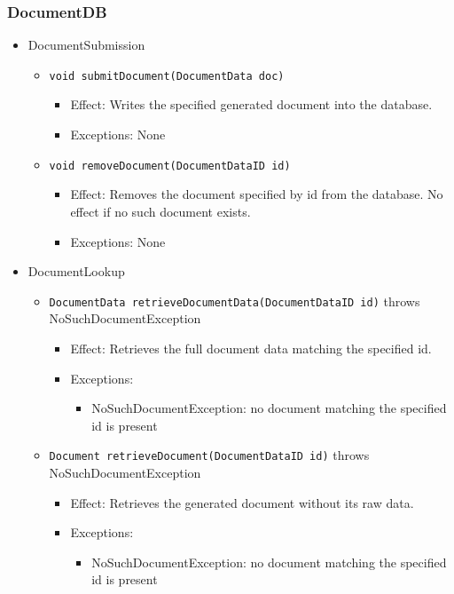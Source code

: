 \documentclass[a4paper,10pt]{article}
\begin{document}
\subsubsection*{DocumentDB}
\begin{itemize}
    \item DocumentSubmission
    \begin{itemize}
        \item \texttt{void submitDocument(DocumentData doc)}
        \begin{itemize}
            \item Effect: Writes the specified generated document into the database.
            \item Exceptions: None
        \end{itemize}

        \item \texttt{void removeDocument(DocumentDataID id)}
        \begin{itemize}
            \item Effect: Removes the document specified by id from the database. No effect if no such document exists.
            \item Exceptions: None
         \end{itemize}
    \end{itemize}
    
    \item DocumentLookup
    	\begin{itemize}
    		\item \texttt{DocumentData retrieveDocumentData(DocumentDataID id)} throws NoSuchDocumentException
    		\begin{itemize}
    			\item Effect: Retrieves the full document data matching the specified id.
    			\item Exceptions: 
    			\begin{itemize}
    				\item NoSuchDocumentException: no document matching the specified id is present
    			\end{itemize}
    		\end{itemize}
    		
    		\item \texttt{Document retrieveDocument(DocumentDataID id)} throws NoSuchDocumentException
    		\begin{itemize}
    			\item Effect: Retrieves the generated document without its raw data.
    			\item Exceptions: 
    			\begin{itemize}
    				\item NoSuchDocumentException: no document matching the specified id is present
    			\end{itemize}
    		\end{itemize}
    		

\end{itemize}
\end{itemize}
\end{document}
